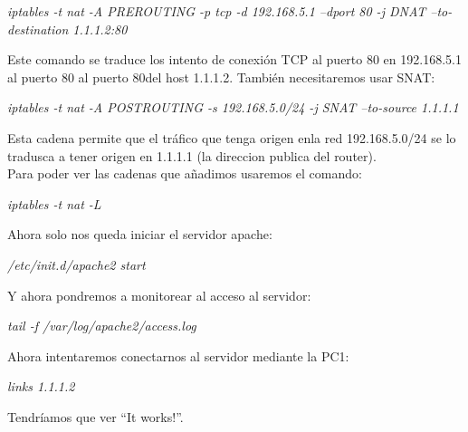 \documentclass{article}
\begin{document}
\begin{center}
	\textit{iptables -t nat -A PREROUTING -p tcp -d 192.168.5.1 --dport 80 -j DNAT --to-destination 1.1.1.2:80}
\end{center}

Este comando se traduce los intento de conexión TCP al puerto 80 en 192.168.5.1 al puerto 80 al puerto 80del host 1.1.1.2.
También necesitaremos usar SNAT:

\begin{center}
	\textit{iptables -t nat -A POSTROUTING -s 192.168.5.0/24 -j SNAT --to-source 1.1.1.1}
\end{center}

Esta cadena permite que el tráfico que tenga origen enla red 192.168.5.0/24 se lo tradusca a tener origen en 1.1.1.1 (la direccion publica del router).\\
Para poder ver las cadenas que añadimos usaremos el comando: 

\begin{center}
	\textit{iptables -t nat -L}
\end{center}

Ahora solo nos queda iniciar el servidor apache:

\begin{center}
	\textit{/etc/init.d/apache2 start}
\end{center}

Y ahora pondremos a monitorear al acceso al servidor: 

\begin{center}
	\textit{tail -f /var/log/apache2/access.log}
\end{center}

Ahora intentaremos conectarnos al servidor mediante la PC1:

\begin{center}
	\textit{links 1.1.1.2}
\end{center}
Tendríamos que ver “It works!”.
\end{document}

